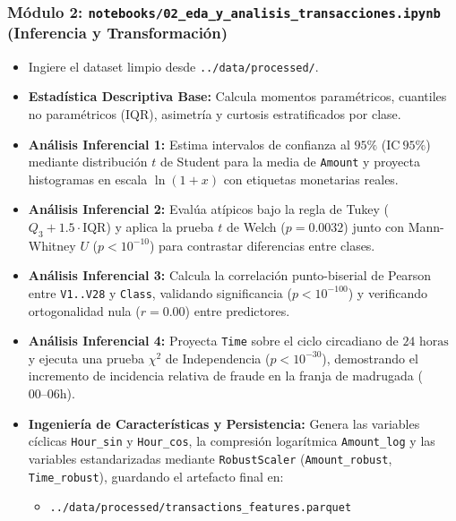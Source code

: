 \documentclass[11pt]{article}
\begin{document}
\subsubsection{Módulo 2: \texttt{notebooks/02\_eda\_y\_analisis\_transacciones.ipynb} (Inferencia y Transformación)}
\label{sec:org997be1b}
\begin{itemize}
\item Ingiere el dataset limpio desde \texttt{../data/processed/}.
\item \textbf{Estadística Descriptiva Base:} Calcula momentos paramétricos, cuantiles no paramétricos (IQR), asimetría y curtosis estratificados por clase.
\item \textbf{Análisis Inferencial 1:} Estima intervalos de confianza al \(95\%\) (\(\text{IC}\ 95\%\)) mediante distribución \(t\) de Student para la media de \texttt{Amount} y proyecta histogramas en escala \(\ln(1 + x)\) con etiquetas monetarias reales.
\item \textbf{Análisis Inferencial 2:} Evalúa atípicos bajo la regla de Tukey (\(Q_3 + 1.5 \cdot \text{IQR}\)) y aplica la prueba \(t\) de Welch (\(p = 0.0032\)) junto con Mann-Whitney \(U\) (\(p < 10^{-10}\)) para contrastar diferencias entre clases.
\item \textbf{Análisis Inferencial 3:} Calcula la correlación punto-biserial de Pearson entre \texttt{V1..V28} y \texttt{Class}, validando significancia (\(p < 10^{-100}\)) y verificando ortogonalidad nula (\(r = 0.00\)) entre predictores.
\item \textbf{Análisis Inferencial 4:} Proyecta \texttt{Time} sobre el ciclo circadiano de \(24\text{ horas}\) y ejecuta una prueba \(\chi^2\) de Independencia (\(p < 10^{-30}\)), demostrando el incremento de incidencia relativa de fraude en la franja de madrugada (\(00\text{--}06\text{h}\)).
\item \textbf{Ingeniería de Características y Persistencia:} Genera las variables cíclicas \texttt{Hour\_sin} y \texttt{Hour\_cos}, la compresión logarítmica \texttt{Amount\_log} y las variables estandarizadas mediante \texttt{RobustScaler} (\texttt{Amount\_robust}, \texttt{Time\_robust}), guardando el artefacto final en:
\begin{itemize}
\item \texttt{../data/processed/transactions\_features.parquet}
\end{itemize}
\end{itemize}
\end{document}
